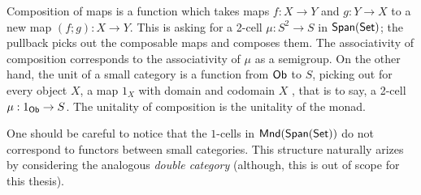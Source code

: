 Composition of maps is a function which takes maps $f:X\to Y$ and $g:Y\to X$ to a new map $(f;g):X\to Y$.   This is asking for a 2-cell $\mu:S^2\to S$ in $\mathsf{Span}(\mathsf{Set})$; the pullback picks out the composable maps and composes them.  The associativity of composition corresponds to the associativity of $\mu$ as a semigroup.
On the other hand, the unit of a small category is a function from ${\sf Ob}$ to $S$, picking out for every object $X$, a map $1_X$ with domain and codomain $X$ , that is to say, a 2-cell $\mu:1_{\sf Ob}\to S$.  The unitality of composition is the unitality of the monad.

One should be careful to notice that the $1$-cells in ${\sf Mnd}(\mathsf{Span}(\mathsf{Set}))$ do not correspond to functors between small categories.  This structure naturally arizes by considering the analogous {\em double category} (although, this is out of scope for this thesis).


